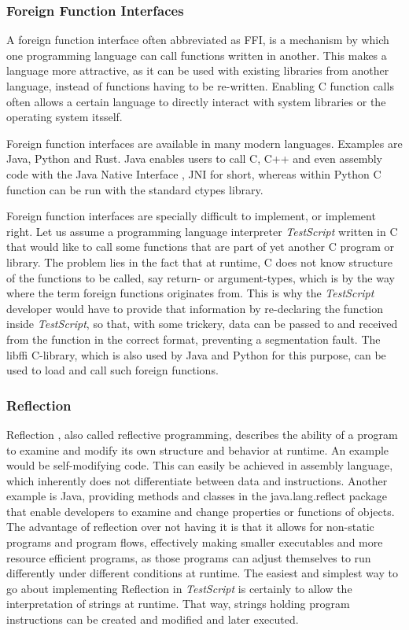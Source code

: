 \documentclass[12pt,a4paper]{article}
\newcommand{\cte}[1] {
    \cite{#1}
}
\newcommand{\name}{\emph{TestScript}}
\begin{document}
\subsubsection{Foreign Function Interfaces}
A foreign function interface\cte{FFI} often abbreviated as FFI,
is a mechanism by which one programming language can call functions written 
in another. This makes a language more attractive, as it can be used with
existing libraries from another language, instead of functions having to be
re-written. Enabling C function calls often allows a certain language to
directly interact with system libraries or the operating system itsself.

Foreign function interfaces are available in many modern languages.
Examples are Java, Python and Rust.
Java enables users to call C, C++ and even assembly code with the Java Native
Interface\cte{JNI}, JNI for short, whereas within Python C function can
be run with the standard ctypes\cte{ctypes} library.

Foreign function interfaces are specially difficult to implement, or implement
right. Let us assume a programming language interpreter \name{} written in C that
would like to call some functions that are part of yet another C program or
library. The problem lies in the fact that at runtime, C does not know
structure of the functions to be called, say return- or argument-types, which
is by the way where the term foreign functions originates from. This is why the
\name{} developer would have to provide that information by re-declaring the
function inside \name{}, so that, with some trickery, data can be passed to and
received from the function in the correct format, preventing a segmentation
fault. The libffi\cte{libffi} C-library, which is also used by Java and
Python for this purpose, can be used to load and call such foreign functions.

\subsubsection{Reflection}
Reflection\cte{reflection}, also called reflective programming, describes
the ability of a program to examine and modify its own structure and behavior 
at runtime. An example would be self-modifying code. This can easily be
achieved in assembly language, which inherently does not differentiate between
data and instructions.
Another example is Java, providing methods and classes in the java.lang.reflect
package that enable developers to examine and change properties or functions
of objects.
The advantage of reflection over not having it is that it allows for non-static
programs and program flows, effectively making smaller executables and more
resource efficient programs, as those programs can adjust themselves to run
differently under different conditions at runtime.
The easiest and simplest way to go about implementing Reflection in \name{} is
certainly to allow the interpretation of strings at runtime. That way, strings
holding program instructions can be created and modified and later executed.
\end{document}
